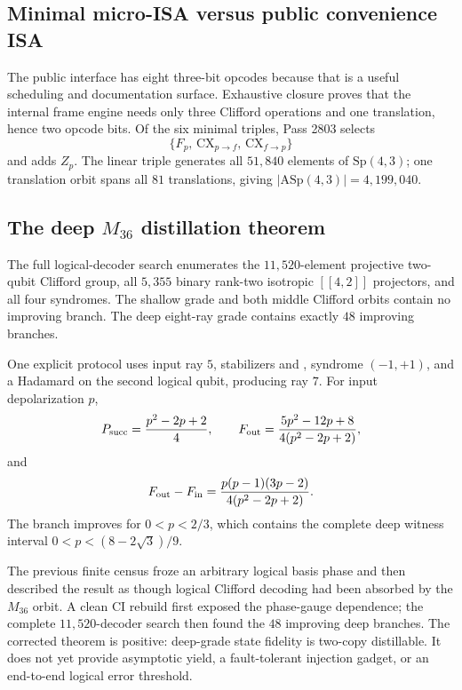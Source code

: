 \subsection{Minimal micro-ISA versus public convenience ISA}
The public interface has eight three-bit opcodes because that is a useful scheduling and
documentation surface. Exhaustive closure proves that the internal frame engine needs
only three Clifford operations and one translation, hence two opcode bits. Of the six
minimal triples, Pass 2803 selects
\[
 \{F_p,\,\mathrm{CX}_{p\to f},\,\mathrm{CX}_{f\to p}\}
\]
and adds $Z_p$. The linear triple generates all $51{,}840$ elements of
$\mathrm{Sp}(4,3)$; one translation orbit spans all $81$ translations, giving
$|\mathrm{ASp}(4,3)|=4{,}199{,}040$.


\subsection{The deep $M_{36}$ distillation theorem}
The full logical-decoder search enumerates the $11{,}520$-element projective two-qubit
Clifford group, all $5{,}355$ binary rank-two isotropic $[[4,2]]$ projectors, and all four
syndromes. The shallow grade and both middle Clifford orbits contain no improving branch.
The deep eight-ray grade contains exactly $48$ improving branches.

One explicit protocol uses input ray $5$, stabilizers  and , syndrome
$(-1,+1)$, and a Hadamard on the second logical qubit, producing ray $7$. For input
depolarization $p$,
\[
 P_{\rm succ}=\frac{p^2-2p+2}{4},\qquad
 F_{\rm out}=\frac{5p^2-12p+8}{4(p^2-2p+2)},
\]
and
\[
 F_{\rm out}-F_{\rm in}
 =\frac{p(p-1)(3p-2)}{4(p^2-2p+2)}.
\]
The branch improves for $0<p<2/3$, which contains the complete deep witness interval
$0<p<(8-2\sqrt3)/9$.

\begin{gotwrong}
The previous finite census froze an arbitrary logical basis phase and then described the
result as though logical Clifford decoding had been absorbed by the $M_{36}$ orbit. A
clean CI rebuild first exposed the phase-gauge dependence; the complete $11{,}520$-decoder
search then found the $48$ improving deep branches. The corrected theorem is positive:
deep-grade state fidelity is two-copy distillable. It does not yet provide asymptotic
yield, a fault-tolerant injection gadget, or an end-to-end logical error threshold.
\end{gotwrong}

